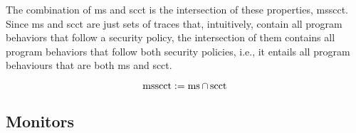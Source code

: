 \documentclass[utf8,acmsmall,review,screen,dvipsnames,anonymous]{acmart}
\begin{document}
The combination of \gls*{ms} and \gls*{scct} is the intersection of these properties, \gls*{msscct}.
Since \gls*{ms} and \gls*{scct} are just sets of traces that, intuitively, contain all program behaviors that follow a security policy, the intersection of them contains all program behaviors that follow both security policies, i.e., it entails all program behaviours that are both \gls*{ms} and \gls*{scct}.

\begin{definition}\label{def:trace:msscctdef}
  $$
  \operatorname{msscct}:=\operatorname{ms}\cap\operatorname{scct}
  $$
\end{definition}

\subsection{Monitors}\label{subsec:monitors}
\end{document}
